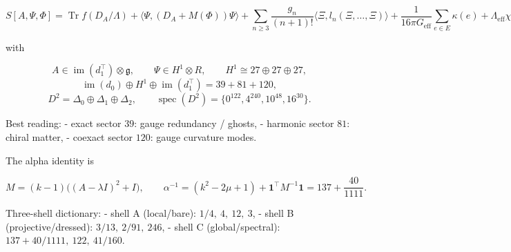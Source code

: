 \[
\boxed{
S[A,\Psi,\Phi]
=
\operatorname{Tr} f(D_A/\Lambda)
+
\langle \Psi,(D_A + M(\Phi))\Psi\rangle
+
\sum_{n\ge 3}\frac{g_n}{(n+1)!}\langle \Xi,l_n(\Xi,\ldots,\Xi)\rangle
+
\frac{1}{16\pi G_{\mathrm{eff}}}\sum_{e\in E}\kappa(e)
+
\Lambda_{\mathrm{eff}}\chi
}
\]

with

\[
A \in \operatorname{im}(d_1^\top)\otimes \mathfrak g,\qquad
\Psi \in H^1 \otimes R,\qquad
H^1 \cong 27\oplus 27\oplus 27,
\]
\[
\operatorname{im}(d_0)\oplus H^1 \oplus \operatorname{im}(d_1^\top)=39+81+120,
\]
\[
D^2 = \Delta_0 \oplus \Delta_1 \oplus \Delta_2,
\qquad
\operatorname{spec}(D^2)=\{0^{122},4^{240},10^{48},16^{30}\}.
\]

Best reading:
- exact sector \(39\): gauge redundancy / ghosts,
- harmonic sector \(81\): chiral matter,
- coexact sector \(120\): gauge curvature modes.

The alpha identity is

\[
M=(k-1)\big((A-\lambda I)^2+I\big),
\qquad
\alpha^{-1}= (k^2-2\mu+1)+\mathbf 1^\top M^{-1}\mathbf 1
=137+\frac{40}{1111}.
\]

Three-shell dictionary:
- shell A (local/bare): \(1/4,\ 4,\ 12,\ 3\),
- shell B (projective/dressed): \(3/13,\ 2/91,\ 246\),
- shell C (global/spectral): \(137+40/1111,\ 122,\ 41/160\).
